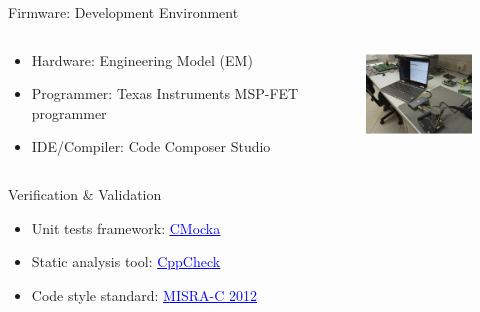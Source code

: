 
\begin{frame}{Firmware: Development Environment}

    \begin{columns}[t]
        \begin{column}[t]{0.6\textwidth}
            \begin{itemize}
                \item Hardware: Engineering Model (EM)
                \vspace{0.4cm}
                \item Programmer: Texas Instruments MSP-FET programmer
                \vspace{0.4cm}
                \item IDE/Compiler: Code Composer Studio
                \vspace{0.4cm}
            \end{itemize}
        \end{column}
        \begin{column}[t]{0.4\textwidth}
            \begin{figure}[!ht]
                \begin{center}
                    \includegraphics[width=4cm]{figures/obdh2-bench.png}
                \end{center}
            \end{figure}
        \end{column}
    \end{columns}

\end{frame}


\begin{frame}{Verification \& Validation}

    \begin{itemize}
        \item Unit tests framework: \href{https://cmocka.org/}{\textcolor{blue}{\underline{CMocka}}}
        \vspace{0.5cm}
        \item Static analysis tool: \href{https://cppcheck.sourceforge.io/}{\textcolor{blue}{\underline{CppCheck}}}
        \vspace{0.5cm}
        \item Code style standard: \href{https://www.misra.org.uk/}{\textcolor{blue}{\underline{MISRA-C 2012}}}
    \end{itemize}

\end{frame}

